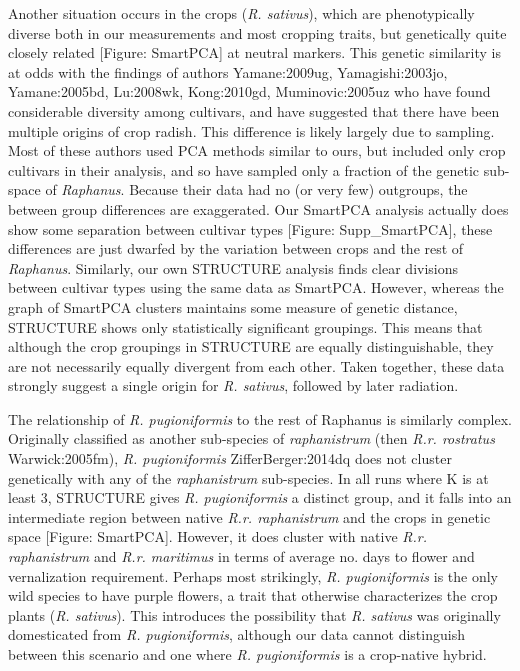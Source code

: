 \documentclass[twocolumn]{bmcart}%
\begin{document}
Another situation occurs in the crops (\textit{R. sativus}), which are phenotypically diverse both in our measurements and most cropping traits, but genetically quite closely related [Figure: SmartPCA] at neutral markers. This genetic similarity is at odds with the findings of authors {Yamane:2009ug, Yamagishi:2003jo, Yamane:2005bd, Lu:2008wk, Kong:2010gd, Muminovic:2005uz } who have found considerable diversity among cultivars, and have suggested that there have been multiple origins of crop radish. This difference is likely largely due to sampling. Most of these authors used PCA methods similar to ours, but included only crop cultivars in their analysis, and so have sampled only a fraction of the genetic sub-space of \textit{Raphanus}. Because their data had no (or very few) outgroups, the between group differences are exaggerated. Our SmartPCA analysis actually does show some separation between cultivar types [Figure: Supp\_SmartPCA], these differences are just dwarfed by the variation between crops and the rest of \textit{Raphanus}. Similarly, our own STRUCTURE analysis finds clear divisions between cultivar types using the same data as SmartPCA. However, whereas the graph of SmartPCA clusters maintains some measure of genetic distance, STRUCTURE shows only statistically significant groupings. This means that although the crop groupings in STRUCTURE are equally distinguishable, they are not necessarily equally divergent from each other. Taken together, these data strongly suggest a single origin for \textit{R. sativus}, followed by later radiation.

The relationship of \textit{R. pugioniformis} to the rest of Raphanus is similarly complex. Originally classified as another sub-species of \textit{raphanistrum} (then \textit{R.r. rostratus} {Warwick:2005fm}), \textit{R. pugioniformis} {ZifferBerger:2014dq} does not cluster genetically with any of the \textit{raphanistrum} sub-species. In all runs where K is at least 3, STRUCTURE gives \textit{R. pugioniformis} a distinct group, and it falls into an intermediate region between native \textit{R.r. raphanistrum} and the crops in genetic space [Figure: SmartPCA]. However, it does cluster with native \textit{R.r. raphanistrum} and \textit{R.r. maritimus} in terms of average no. days to flower and vernalization requirement. Perhaps most strikingly, \textit{R. pugioniformis} is the only wild species to have purple flowers, a trait that otherwise characterizes the crop plants (\textit{R. sativus}). This introduces the possibility that \textit{R. sativus} was originally domesticated from \textit{R. pugioniformis}, although our data cannot distinguish between this scenario and one where \textit{R. pugioniformis} is a crop-native hybrid.
\end{document}
